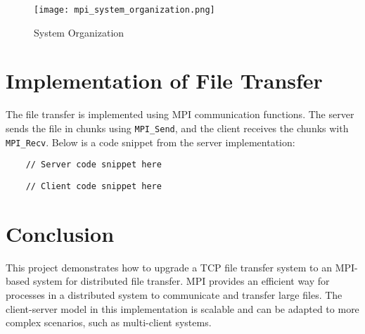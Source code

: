 \documentclass{article}
\begin{document}
\begin{figure}[h!]
\centering
\texttt{[image: mpi\_system\_organization.png]}
\caption{System Organization}
\end{figure}

\section{Implementation of File Transfer}
The file transfer is implemented using MPI communication functions. The server sends the file in chunks using \texttt{MPI\_Send}, and the client receives the chunks with \texttt{MPI\_Recv}. Below is a code snippet from the server implementation:

\begin{verbatim}
    // Server code snippet here
\end{verbatim}

\begin{verbatim}
    // Client code snippet here
\end{verbatim}

\section{Conclusion}
This project demonstrates how to upgrade a TCP file transfer system to an MPI-based system for distributed file transfer. MPI provides an efficient way for processes in a distributed system to communicate and transfer large files. The client-server model in this implementation is scalable and can be adapted to more complex scenarios, such as multi-client systems.
\end{document}
